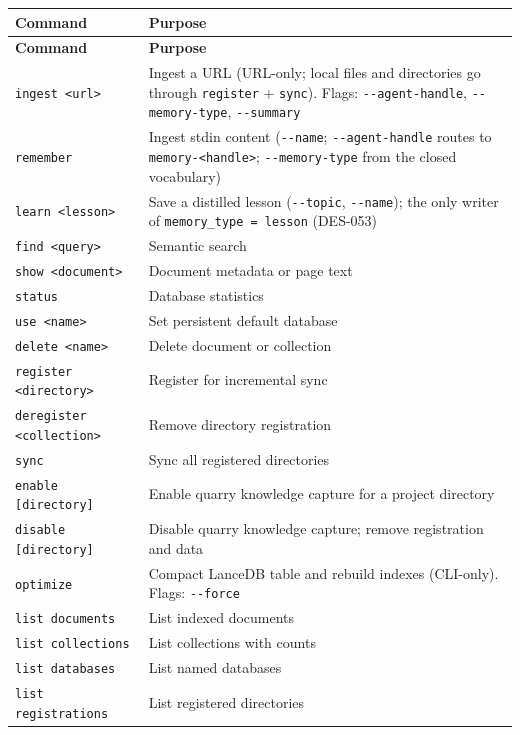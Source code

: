 \documentclass[a4paper,10pt]{article}
\begin{document}
\begin{center}
\begin{longtable}{lp{8cm}}
\toprule
\textbf{Command} & \textbf{Purpose} \\
\midrule
\endfirsthead
\toprule
\textbf{Command} & \textbf{Purpose} \\
\midrule
\endhead
\texttt{ingest <url>}         & Ingest a URL (URL-only; local files and
  directories go through \texttt{register} + \texttt{sync}).  Flags:
  \texttt{-{}-agent-handle}, \texttt{-{}-memory-type}, \texttt{-{}-summary} \\
\texttt{remember}             & Ingest stdin content (\texttt{-{}-name};
  \texttt{-{}-agent-handle} routes to \texttt{memory-<handle>};
  \texttt{-{}-memory-type} from the closed vocabulary) \\
\texttt{learn <lesson>}       & Save a distilled lesson (\texttt{-{}-topic},
  \texttt{-{}-name}); the only writer of \texttt{memory\_type = lesson}
  (DES-053) \\
\texttt{find <query>}         & Semantic search \\
\texttt{show <document>}      & Document metadata or page text \\
\texttt{status}               & Database statistics \\
\texttt{use <name>}           & Set persistent default database \\
\texttt{delete <name>}        & Delete document or collection \\
\texttt{register <directory>} & Register for incremental sync \\
\texttt{deregister <collection>} & Remove directory registration \\
\texttt{sync}                 & Sync all registered directories \\
\texttt{enable [directory]}   & Enable quarry knowledge capture for a project directory \\
\texttt{disable [directory]}  & Disable quarry knowledge capture; remove registration and data \\
\texttt{optimize}             & Compact LanceDB table and rebuild indexes (CLI-only).
  Flags: \texttt{-{}-force} \\
\texttt{list documents}       & List indexed documents \\
\texttt{list collections}     & List collections with counts \\
\texttt{list databases}       & List named databases \\
\texttt{list registrations}   & List registered directories \\

\end{longtable}
\end{center}
\end{document}
